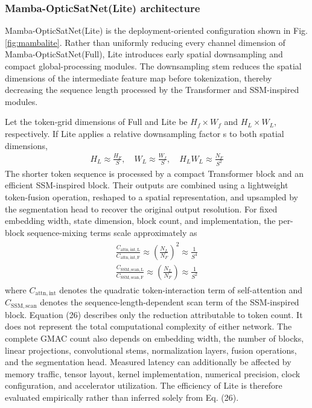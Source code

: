 \documentclass[a4paper,fleqn]{cas-dc}
\begin{document}
\subsubsection{Mamba-OpticSatNet(Lite) architecture}
Mamba-OpticSatNet(Lite) is the deployment-oriented configuration shown in Fig. \ref{fig:mambalite}. Rather than uniformly reducing every channel dimension of Mamba-OpticSatNet(Full), Lite introduces early spatial downsampling and compact global-processing modules. The downsampling stem reduces the spatial dimensions of the intermediate feature map before tokenization, thereby decreasing the sequence length processed by the Transformer and SSM-inspired modules.

Let the token-grid dimensions of Full and Lite be \(H_f \times W_f\) and \(H_L \times W_L\), respectively. If Lite applies a relative downsampling factor s to both spatial dimensions,
\begin{eqnarray}
	H_L \approx \frac{H_F}{S}, \quad W_L \approx \frac{W_f}{S}, \quad H_L W_L \approx \frac{N_F}{S^2}
\end{eqnarray}
The shorter token sequence is processed by a compact Transformer block and an efficient SSM-inspired block. Their outputs are combined using a lightweight token-fusion operation, reshaped to a spatial representation, and upsampled by the segmentation head to recover the original output resolution.
For fixed embedding width, state dimension, block count, and implementation, the per-block sequence-mixing terms scale approximately as
\begin{eqnarray}
	\begin{aligned}
	\frac{C_{\mathrm{attn, int, L}}}{C_{\mathrm{attn, int, F}}} \approx \left(\frac{N_L}{N_F}\right)^2 \approx \frac{1}{S^4}\\
	\frac{C_{\mathrm{SSM, scan, L}}}{C_{\mathrm{SSM, scan, F}}} \approx \left(\frac{N_L}{N_F}\right) \approx \frac{1}{S^2}
	\end{aligned}
\end{eqnarray}
where \(C_{\mathrm{attn, int}}\) denotes the quadratic token-interaction term of self-attention and \(C_{\mathrm{SSM, scan}}\) denotes the sequence-length-dependent scan term of the SSM-inspired block.
Equation (26) describes only the reduction attributable to token count. It does not represent the total computational complexity of either network. The complete GMAC count also depends on embedding width, the number of blocks, linear projections, convolutional stems, normalization layers, fusion operations, and the segmentation head. Measured latency can additionally be affected by memory traffic, tensor layout, kernel implementation, numerical precision, clock configuration, and accelerator utilization. The efficiency of Lite is therefore evaluated empirically rather than inferred solely from Eq. (26).
\end{document}
